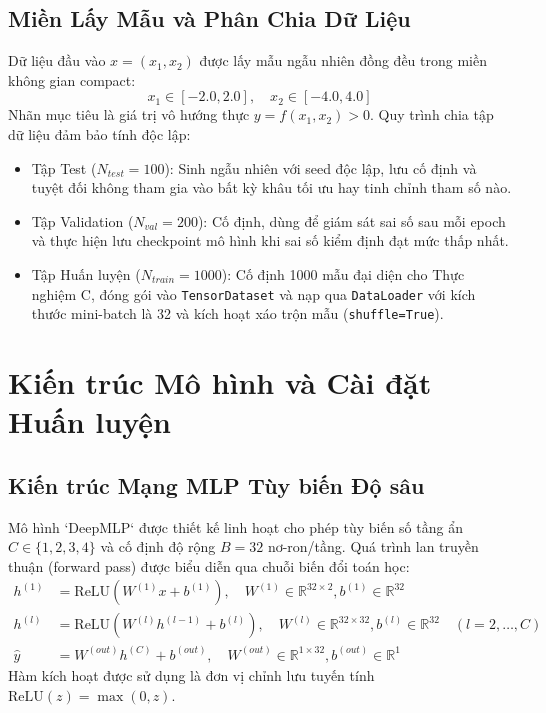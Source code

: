 \documentclass[a4paper,13pt]{extarticle}
\begin{document}
\subsection{Miền Lấy Mẫu và Phân Chia Dữ Liệu}
Dữ liệu đầu vào $x = (x_1, x_2)$ được lấy mẫu ngẫu nhiên đồng đều trong miền không gian compact:
\begin{equation}
    x_1 \in [-2.0, 2.0], \quad x_2 \in [-4.0, 4.0]
\end{equation}
Nhãn mục tiêu là giá trị vô hướng thực $y = f(x_1, x_2) > 0$. Quy trình chia tập dữ liệu đảm bảo tính độc lập:
\begin{itemize}
    \item[-]{Tập Test ($N_{test} = 100$):} Sinh ngẫu nhiên với seed độc lập, lưu cố định và tuyệt đối không tham gia vào bất kỳ khâu tối ưu hay tinh chỉnh tham số nào.
    \item[-] {Tập Validation ($N_{val} = 200$):} Cố định, dùng để giám sát sai số sau mỗi epoch và thực hiện lưu checkpoint mô hình khi sai số kiểm định đạt mức thấp nhất.
    \item [-]{Tập Huấn luyện ($N_{train} = 1000$):} Cố định 1000 mẫu đại diện cho Thực nghiệm C, đóng gói vào \texttt{TensorDataset} và nạp qua \texttt{DataLoader} với kích thước mini-batch là 32 và kích hoạt xáo trộn mẫu (\texttt{shuffle=True}).
\end{itemize}

\section{Kiến trúc Mô hình và Cài đặt Huấn luyện}
\subsection{Kiến trúc Mạng MLP Tùy biến Độ sâu}
Mô hình `DeepMLP` được thiết kế linh hoạt cho phép tùy biến số tầng ẩn $C \in \{1, 2, 3, 4\}$ và cố định độ rộng $B = 32$ nơ-ron/tầng. Quá trình lan truyền thuận (forward pass) được biểu diễn qua chuỗi biến đổi toán học:
\begin{align}
    h^{(1)} &= \text{ReLU}\left(W^{(1)} x + b^{(1)}\right), \quad W^{(1)} \in \mathbb{R}^{32 \times 2}, b^{(1)} \in \mathbb{R}^{32} \\
    h^{(l)} &= \text{ReLU}\left(W^{(l)} h^{(l-1)} + b^{(l)}\right), \quad W^{(l)} \in \mathbb{R}^{32 \times 32}, b^{(l)} \in \mathbb{R}^{32} \quad (l = 2, \dots, C) \\
    \hat{y} &= W^{(out)} h^{(C)} + b^{(out)}, \quad W^{(out)} \in \mathbb{R}^{1 \times 32}, b^{(out)} \in \mathbb{R}^{1}
\end{align}
Hàm kích hoạt được sử dụng là đơn vị chỉnh lưu tuyến tính $\text{ReLU}(z) = \max(0, z)$.
\end{document}
